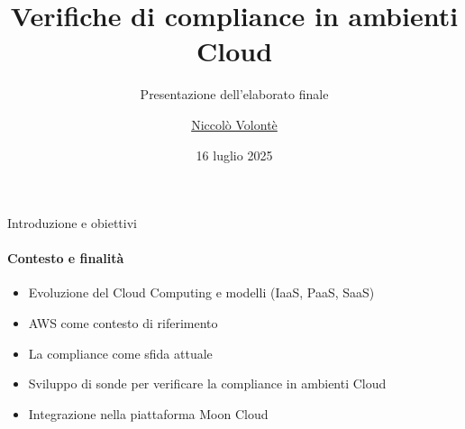 \documentclass{beamer}
\title{Verifiche di compliance in ambienti Cloud}
\subtitle{Presentazione dell'elaborato finale}
\author{\href{mailto:niccolo.volonte@studenti.unimi.it}{Niccolò Volontè}}
\date{16 luglio 2025}
\begin{document}
\maketitle




\begin{frame}{Introduzione e obiettivi}
    \framesubtitle{Contesto e finalità}
    \begin{itemize}
        \item Evoluzione del Cloud Computing e modelli (IaaS, PaaS, SaaS)
        \item AWS come contesto di riferimento
        \item La compliance come sfida attuale
        \item Sviluppo di sonde per verificare la compliance in ambienti Cloud
        \item Integrazione nella piattaforma Moon Cloud
    \end{itemize}
\end{frame}
\end{document}
